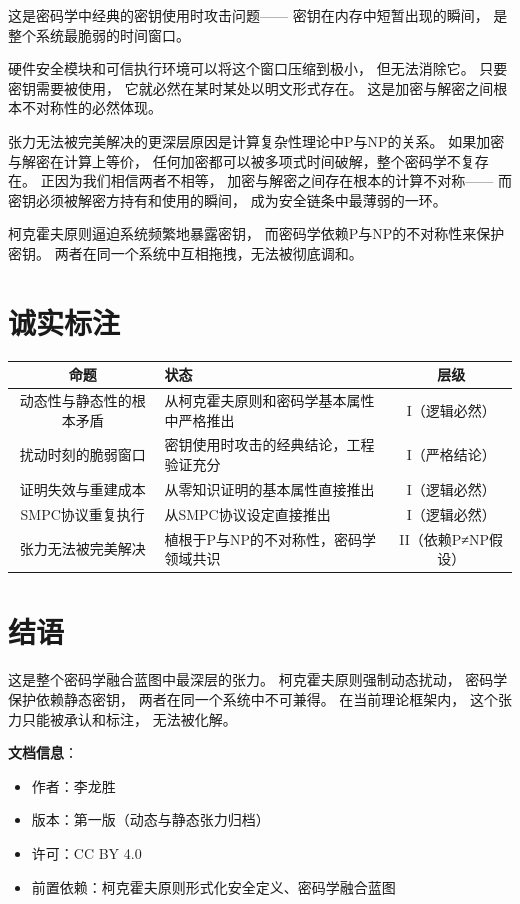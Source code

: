 \documentclass[11pt,a4paper]{article}
\begin{document}
这是密码学中经典的密钥使用时攻击问题——
密钥在内存中短暂出现的瞬间，
是整个系统最脆弱的时间窗口。

硬件安全模块和可信执行环境可以将这个窗口压缩到极小，
但无法消除它。
只要密钥需要被使用，
它就必然在某时某处以明文形式存在。
这是加密与解密之间根本不对称性的必然体现。

张力无法被完美解决的更深层原因是计算复杂性理论中P与NP的关系。
如果加密与解密在计算上等价，
任何加密都可以被多项式时间破解，整个密码学不复存在。
正因为我们相信两者不相等，
加密与解密之间存在根本的计算不对称——
而密钥必须被解密方持有和使用的瞬间，
成为安全链条中最薄弱的一环。

柯克霍夫原则逼迫系统频繁地暴露密钥，
而密码学依赖P与NP的不对称性来保护密钥。
两者在同一个系统中互相拖拽，无法被彻底调和。

\section{诚实标注}

\begin{center}
\begin{xltabular}{\textwidth}{c|X|c}
\toprule
\textbf{命题} & \textbf{状态} & \textbf{层级} \\
\midrule
动态性与静态性的根本矛盾 &
从柯克霍夫原则和密码学基本属性中严格推出 &
I（逻辑必然） \\
扰动时刻的脆弱窗口 &
密钥使用时攻击的经典结论，工程验证充分 &
I（严格结论） \\
证明失效与重建成本 &
从零知识证明的基本属性直接推出 &
I（逻辑必然） \\
SMPC协议重复执行 &
从SMPC协议设定直接推出 &
I（逻辑必然） \\
张力无法被完美解决 &
植根于P与NP的不对称性，密码学领域共识 &
II（依赖P≠NP假设） \\
\bottomrule
\end{xltabular}
\end{center}

\section{结语}

这是整个密码学融合蓝图中最深层的张力。
柯克霍夫原则强制动态扰动，
密码学保护依赖静态密钥，
两者在同一个系统中不可兼得。
在当前理论框架内，
这个张力只能被承认和标注，
无法被化解。

\vspace{5mm}
\noindent\textbf{文档信息}：
\begin{itemize}
    \item 作者：李龙胜
    \item 版本：第一版（动态与静态张力归档）
    \item 许可：CC BY 4.0
    \item 前置依赖：柯克霍夫原则形式化安全定义、密码学融合蓝图
\end{itemize}
\end{document}
